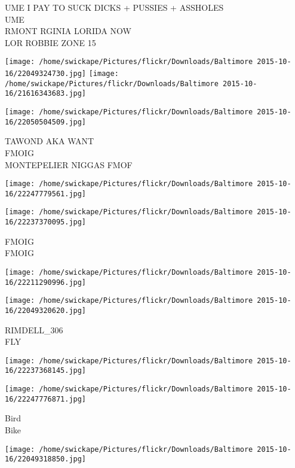 \documentclass[10pt,letterpaper]{article}
\begin{document}
UME I PAY TO SUCK DICKS + PUSSIES + ASSHOLES\\
UME\\
RMONT RGINIA LORIDA NOW\\
LOR ROBBIE ZONE 15\\
\pagebreak

\texttt{[image: /home/swickape/Pictures/flickr/Downloads/Baltimore 2015-10-16/22049324730.jpg]}
\texttt{[image: /home/swickape/Pictures/flickr/Downloads/Baltimore 2015-10-16/21616343683.jpg]}

\vspace{0.25in}
\texttt{[image: /home/swickape/Pictures/flickr/Downloads/Baltimore 2015-10-16/22050504509.jpg]}

TAWOND AKA WANT\\
FMOIG\\
MONTEPELIER NIGGAS FMOF\\
\pagebreak

\texttt{[image: /home/swickape/Pictures/flickr/Downloads/Baltimore 2015-10-16/22247779561.jpg]}

\vspace{0.25in}
\texttt{[image: /home/swickape/Pictures/flickr/Downloads/Baltimore 2015-10-16/22237370095.jpg]}

FMOIG\\
FMOIG\\
\pagebreak

\texttt{[image: /home/swickape/Pictures/flickr/Downloads/Baltimore 2015-10-16/22211290996.jpg]}

\vspace{0.25in}
\texttt{[image: /home/swickape/Pictures/flickr/Downloads/Baltimore 2015-10-16/22049320620.jpg]}

RIMDELL\_306\\
FLY\\
\pagebreak

\texttt{[image: /home/swickape/Pictures/flickr/Downloads/Baltimore 2015-10-16/22237368145.jpg]}

\vspace{0.25in}
\texttt{[image: /home/swickape/Pictures/flickr/Downloads/Baltimore 2015-10-16/22247776871.jpg]}

Bird\\
Bike\\
\pagebreak

\texttt{[image: /home/swickape/Pictures/flickr/Downloads/Baltimore 2015-10-16/22049318850.jpg]}
\end{document}
